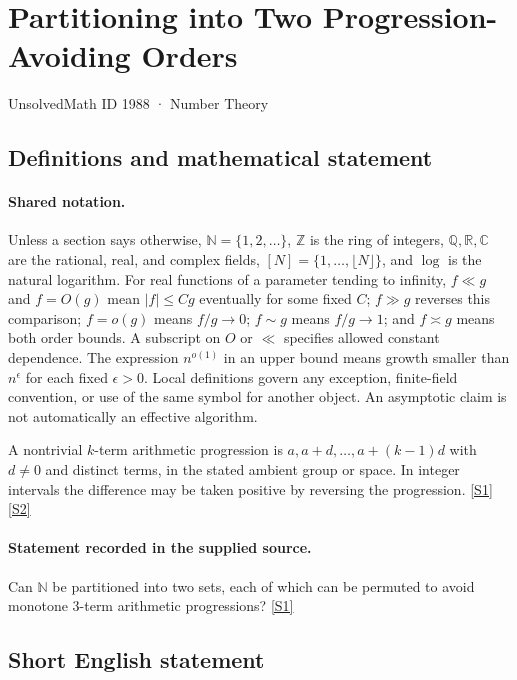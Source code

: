 \documentclass[11pt,a4paper]{article}
\newcommand{\N}{\mathbb{N}}
\newcommand{\Z}{\mathbb{Z}}
\newcommand{\Q}{\mathbb{Q}}
\newcommand{\R}{\mathbb{R}}
\newcommand{\C}{\mathbb{C}}
\newcommand{\sref}[2]{\hyperlink{source:#1:#2}{[S#2]}}
\begin{document}

\setcounter{section}{1987}

\section{Partitioning into Two Progression-Avoiding Orders}\label{1988}

{\small\sffamily UnsolvedMath ID 1988 · Number Theory}

\subsection{Definitions and mathematical statement}

\paragraph{Shared notation.}Unless a section says otherwise, $\N=\{1,2,\ldots\}$,
$\Z$ is the ring of integers, $\Q,\R,\C$ are the rational, real, and complex
fields, $[N]=\{1,\ldots,\lfloor N\rfloor\}$, and $\log$ is the natural
logarithm. For real functions of a parameter tending to infinity,
$f\ll g$ and $f=O(g)$ mean $|f|\leq Cg$ eventually for some fixed $C$;
$f\gg g$ reverses this comparison; $f=o(g)$ means $f/g\to0$;
$f\sim g$ means $f/g\to1$; and $f\asymp g$ means both order bounds.
A subscript on $O$ or $\ll$ specifies allowed constant dependence.
The expression $n^{o(1)}$ in an upper bound means growth smaller than
$n^\epsilon$ for each fixed $\epsilon>0$. Local definitions govern any
exception, finite-field convention, or use of the same symbol for another
object. An asymptotic claim is not automatically an effective algorithm.



A nontrivial $k$-term arithmetic progression is $a,a+d,\ldots,a+(k-1)d$ with $d\ne0$ and distinct terms, in the stated ambient group or space. In integer intervals the difference may be taken positive by reversing the progression. \sref{1988}{1} \sref{1988}{2}

\paragraph{Statement recorded in the supplied source.}
Can $\mathbb{N}$ be partitioned into two sets, each of which can be permuted to avoid monotone 3-term arithmetic progressions? \sref{1988}{1}

\subsection{Short English statement}
\end{document}
